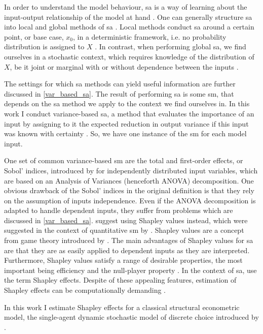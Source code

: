 In order to understand the model behaviour, sa is a way of learning about the input-output relationship of the model at hand \citep{BP16}. One can generally structure sa into local and global methods of sa \citep{BP16}. Local methods conduct sa around a certain point, or base case, $x_0$, in a deterministic framework, i.e. no probability distribution is assigned to $X$ \citep{BP16}. In contrast, when performing global sa, we find ourselves in a stochastic context, which requires knowledge of the distribution of $X$, be it joint or marginal with or without dependence between the inputs \citep{ST02}.

The settings for which sa methods can yield useful information are further discussed in \cref{var_based_sa}. The result of performing sa is some sm, that depends on the sa method we apply to the context we find ourselves in. In this work I conduct variance-based sa, a method that evaluates the importance of an input by assigning to it the expected reduction in output variance if this input was known with certainty \citep{BP16}. So, we have one instance of the sm for each model input.

One set of common variance-based sm are the total and first-order effects, or Sobol' indices, introduced by \citet{S93} for independently distributed input variables, which are based on an Analysis of Variances (henceforth ANOVA) decomposition. One obvious drawback of the Sobol' indices in the original definition is that they rely on the assumption of inputs independence. Even if the ANOVA decomposition is adapted to handle dependent inputs, they suffer from problems \citep{OP17} which are discussed in \cref{var_based_sa}. \citet{OP17} suggest using Shapley values instead, which were suggested in the context of quantitative sm by \citet{O14}. Shapley values are a concept from game theory introduced by \citet{S53}. The main advantages of Shapley values for sa are that they are as easily applied to dependent inputs as they are interpreted. Furthermore, Shapley values satisfy a range of desirable properties, the most important being efficiency and the null-player property \citet{S53, O14}. In the context of sa, \citet{SNS16} use the term Shapley effects. Despite of these appealing features, estimation of Shapley effects can be computationally demanding \citep{SNS16}.

In this work I estimate Shapley effects for a classical structural econometric model, the single-agent dynamic stochastic model of discrete choice introduced by \citet{R87}.